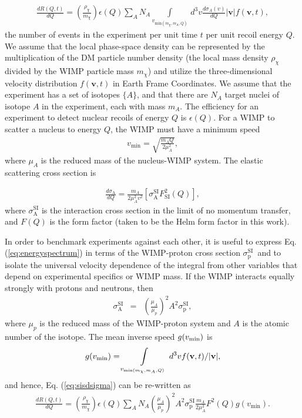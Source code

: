 \documentclass[letterpaper,11pt]{article}
\newcommand{\sigmapsi}{$\sigma_{\mathrm{p}}^{\mathrm{SI}}$}
\newcommand{\sigmapsie}{\sigma_{\mathrm{p}}^{\mathrm{SI}}}
\begin{document}
    \begin{eqnarray}\label{eq:energyspectrum}
  \frac{dR(Q,t)}{dQ} = \left( \frac{\rho_\chi}{m_\chi} \right) \epsilon(Q) 
  \sum_A N_A \int \limits_{v_{\mathrm{min}(m_\chi,m_A,Q)}} \, d^3 v \frac{d\sigma_A(v)}{dQ} |\mathbf{v}| f(\mathbf{v},t),
\end{eqnarray}
the number of events in the experiment per unit time $t$ per unit recoil energy $Q$. We assume that the local phase-space density can be represented by the multiplication of the DM particle number density (the local mass density $\rho_\chi$ divided by the WIMP particle mass $m_\chi$) and utilize the three-dimensional velocity distribution $f(\mathbf{v},t)$ in Earth Frame Coordinates.  We assume that the experiment has a set of isotopes $\{A\}$, and that there are $N_A$ target nuclei of isotope $A$ in the experiment, each with mass $m_A$.  The efficiency for an experiment to detect nuclear recoils of energy $Q$ is $\epsilon(Q)$. For a WIMP to scatter a nucleus to energy $Q$, the WIMP must have a minimum speed
\begin{eqnarray}
  v_{\mathrm{min}}  = \sqrt{\frac{m_A Q}{2 \mu_A^2}},
\end{eqnarray}
where $\mu_A$ is the reduced mass of the nucleus-WIMP system.  The elastic scattering cross section is 

\begin{eqnarray}\label{eq:sisdsigma}
  \frac{d\sigma_{\mathrm{A}}}{dQ} = \frac{m_A}{2\mu_A^2 v^2}\left[ \sigma_{\mathrm{A}}^{\mathrm{SI}} F^2_{\mathrm{SI}} (Q) \right],
\end{eqnarray}
where $\sigma^{\mathrm{SI}}_{\mathrm{A}}$ is the interaction cross section in the limit of no momentum transfer, and $F(Q)$ is the form factor (taken to be the Helm form factor \cite{Engel:1991wq} in this work).  

In order to benchmark experiments against each other, it is useful to express Eq. (\ref{eq:energyspectrum}) in terms of the WIMP-proton cross section \sigmapsi~and to isolate the universal velocity dependence of the integral from other variables that depend on experimental specifics or WIMP mass.  If the WIMP interacts equally strongly with protons and neutrons, then
\begin{eqnarray}
  \sigma_{\mathrm{A}}^{\mathrm{SI}} &=& \left( \frac{\mu_A}{\mu_p} \right)^2 A^2 \sigmapsie,
\end{eqnarray}
where $\mu_p$ is the reduced mass of the WIMP-proton system and $A$ is the atomic number of the isotope.  The mean inverse speed $g(v_{\rm min})$ is
\begin{eqnarray}
  g(v_{\rm min}) = \int \limits_{v_{\mathrm{\rm min}(m_\chi,m_A,Q)}} \, d^3 v  f(\mathbf{v},t) / |\mathbf{v}|, 
\end{eqnarray}
and hence, Eq. (\ref{eq:sisdsigma}) can be re-written as
  \begin{eqnarray}
  \frac{dR(Q,t)}{dQ} = \left( \frac{\rho_\chi}{m_\chi} \right) \epsilon(Q) 
  \sum_A N_A \left( \frac{\mu_A}{\mu_p} \right)^2 A^2 \sigmapsie \frac{m_A}{2\mu_A^2} F^2(Q) g(v_{\mathrm{min}}).
\end{eqnarray}
\end{document}
